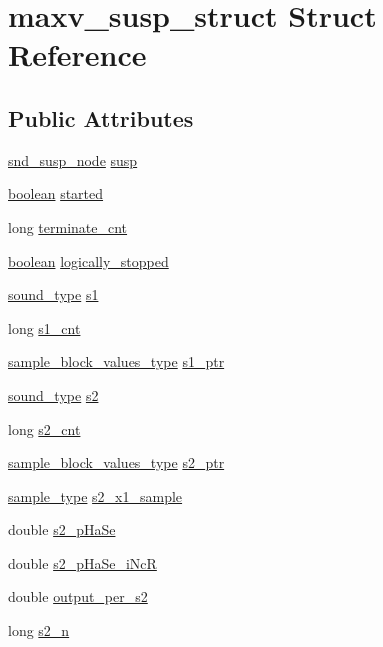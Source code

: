 \hypertarget{structmaxv__susp__struct}{}\section{maxv\+\_\+susp\+\_\+struct Struct Reference}
\label{structmaxv__susp__struct}
\subsection*{Public Attributes}
\begin{DoxyCompactItemize}
\item 
\hyperlink{sound_8h_a6b268203688a934bd798ceb55f85d4c0}{snd\+\_\+susp\+\_\+node} \hyperlink{structmaxv__susp__struct_af857fb3358f9139fc8560d27fa523978}{susp}
\item 
\hyperlink{cext_8h_a7670a4e8a07d9ebb00411948b0bbf86d}{boolean} \hyperlink{structmaxv__susp__struct_ad18d30c27c8ed198f3a1a1d859fa6c09}{started}
\item 
long \hyperlink{structmaxv__susp__struct_a0a9e7c89da4d0a3014de4d2a0a3e1457}{terminate\+\_\+cnt}
\item 
\hyperlink{cext_8h_a7670a4e8a07d9ebb00411948b0bbf86d}{boolean} \hyperlink{structmaxv__susp__struct_a89fb67e00016993f6a4636ea2fb1af4e}{logically\+\_\+stopped}
\item 
\hyperlink{sound_8h_a792cec4ed9d6d636d342d9365ba265ea}{sound\+\_\+type} \hyperlink{structmaxv__susp__struct_aebc4b57d87d27bd0b93b899d5b172e1a}{s1}
\item 
long \hyperlink{structmaxv__susp__struct_a50077b93f72dedc0261126c096ec122e}{s1\+\_\+cnt}
\item 
\hyperlink{sound_8h_a83d17f7b465d1591f27cd28fc5eb8a03}{sample\+\_\+block\+\_\+values\+\_\+type} \hyperlink{structmaxv__susp__struct_a42db5d6d6ee7ada26422237fe40058c0}{s1\+\_\+ptr}
\item 
\hyperlink{sound_8h_a792cec4ed9d6d636d342d9365ba265ea}{sound\+\_\+type} \hyperlink{structmaxv__susp__struct_acac48aed56d1e4af41f047267dd3f55a}{s2}
\item 
long \hyperlink{structmaxv__susp__struct_a1bddbee7aefcf1c5820097d9c4c50cf9}{s2\+\_\+cnt}
\item 
\hyperlink{sound_8h_a83d17f7b465d1591f27cd28fc5eb8a03}{sample\+\_\+block\+\_\+values\+\_\+type} \hyperlink{structmaxv__susp__struct_acdf3a1ba6903e1d13ebb5a569f7bce4d}{s2\+\_\+ptr}
\item 
\hyperlink{sound_8h_a3a9d1d4a1c153390d2401a6e9f71b32c}{sample\+\_\+type} \hyperlink{structmaxv__susp__struct_a598d04f72df0ff955fa8d5c43e6f7008}{s2\+\_\+x1\+\_\+sample}
\item 
double \hyperlink{structmaxv__susp__struct_ab34e85bda7fcc2e3c8458c9b8d92150b}{s2\+\_\+p\+Ha\+Se}
\item 
double \hyperlink{structmaxv__susp__struct_ab1eedf087b0ac05d2f450685cf50342a}{s2\+\_\+p\+Ha\+Se\+\_\+i\+NcR}
\item 
double \hyperlink{structmaxv__susp__struct_a8008c9374d59f9cff3a018bbf97ddbe7}{output\+\_\+per\+\_\+s2}
\item 
long \hyperlink{structmaxv__susp__struct_a40bb422bb5b7dea013834018d41d36bd}{s2\+\_\+n}
\end{DoxyCompactItemize}


